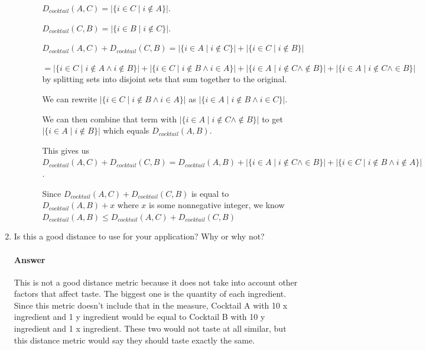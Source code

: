 \documentclass{article}
\begin{document}
\begin{enumerate}
\begin{enumerate}
\begin{enumerate}
       $D_{cocktail}(A, C) = |\{ i \in C \mid i \notin A\}|$.
       
       $D_{cocktail}(C, B) = |\{ i \in B \mid i \notin C\}|$.
       
	$D_{cocktail}(A, C) + D_{cocktail}(C, B) = |\{ i \in A \mid i \notin C\}| + |\{ i \in C \mid i \notin B\}|$
	
	$= |\{ i \in C \mid i \notin A \land i \notin B\}| +  |\{ i \in C \mid i \notin B \land i \in A\}| + |\{ i \in A \mid i \notin C \land  \notin B\}| + |\{ i \in A \mid i \notin C \land  \in B\}|$ 
	\qquad by splitting sets into disjoint sets that sum together to the original.
       
       We can rewrite $|\{ i \in C \mid i \notin B \land i \in A\}|$ as $|\{ i \in A \mid i \notin B \land i \in C\}|$.
       
       We can then combine that term with $ |\{ i \in A \mid i \notin C \land  \notin B\}|$ to get $ |\{ i \in A \mid i \notin B\}|$ which equals $D_{cocktail}(A, B)$.
       
       This gives us $D_{cocktail}(A, C) + D_{cocktail}(C, B) = D_{cocktail}(A, B) + |\{ i \in A \mid i \notin C \land  \in B\}| + |\{ i \in C \mid i \notin B \land i \notin A\}|$.
       
       Since $D_{cocktail}(A, C) + D_{cocktail}(C, B)$ is equal to $D_{cocktail}(A, B) + x$ where $x$ is some nonnegative integer, we know  $D_{cocktail}(A, B) \leq D_{cocktail}(A, C) + D_{cocktail}(C, B)$
       
       \end{enumerate}
       \end{enumerate}
        
    \item Is this a good distance to use for your application?  Why or why not?

        \paragraph{Answer}

        This is not a good distance metric because it does not take into account other factors that affect taste. The biggest one is the quantity of each ingredient. 
        Since this metric doesn't include that in the measure, Cocktail A with 10 x ingredient and 1 y ingredient would be equal to Cocktail B with 10 y ingredient and 1 x ingredient. These two would not taste at all similar, 
        but this distance metric would say they should taste exactly the same.

\end{enumerate}
\end{document}
